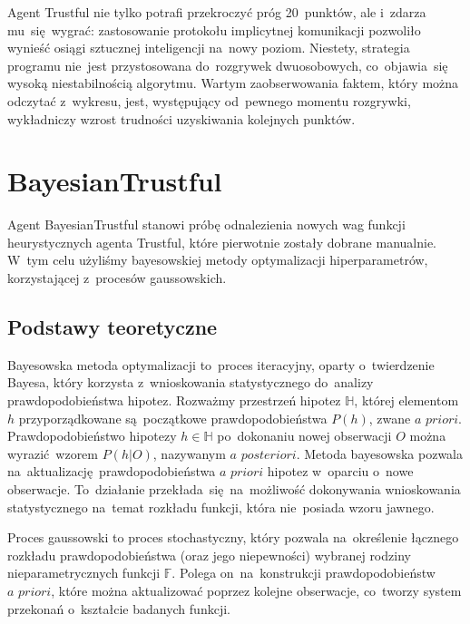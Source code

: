 \documentclass[declaration,shortabstract,inz]{iithesis}
\begin{document}
Agent Trustful nie tylko potrafi przekroczyć próg 20~punktów, ale i~zdarza mu~się~wygrać: zastosowanie protokołu implicytnej komunikacji pozwoliło wynieść osiągi sztucznej inteligencji na~nowy poziom. Niestety, strategia programu nie~jest przystosowana do~rozgrywek dwuosobowych, co~objawia~się wysoką niestabilnością algorytmu. Wartym zaobserwowania faktem, który można odczytać z~wykresu, jest, występujący od~pewnego momentu rozgrywki, wykładniczy wzrost trudności uzyskiwania kolejnych punktów.

\section{BayesianTrustful}

Agent BayesianTrustful stanowi próbę odnalezienia nowych wag funkcji heurystycznych agenta Trustful, które pierwotnie zostały dobrane manualnie. W~tym celu użyliśmy bayesowskiej metody optymalizacji hiperparametrów, korzystającej z~procesów gaussowskich.

\subsection*{Podstawy teoretyczne}

Bayesowska metoda optymalizacji to~proces iteracyjny, oparty o~twierdzenie Bayesa, który korzysta z~wnioskowania statystycznego do~analizy prawdopodobieństwa hipotez. Rozważmy przestrzeń hipotez $\mathbb{H}$, której elementom $h$ przyporządkowane są~początkowe prawdopodobieństwa $P(h)$, zwane $\textit{a priori}$. Prawdopodobieństwo hipotezy $h\in\mathbb{H}$ po~dokonaniu nowej obserwacji $O$ można wyrazić wzorem $P(h|O)$, nazywanym $\textit{a posteriori}$. Metoda bayesowska pozwala na~aktualizację prawdopodobieństwa $\textit{a priori}$ hipotez w~oparciu o~nowe obserwacje. To~działanie przekłada~się~na~możliwość dokonywania wnioskowania statystycznego na~temat rozkładu funkcji, która nie~posiada wzoru jawnego.

Proces gaussowski to proces stochastyczny, który pozwala na~określenie łącznego rozkładu prawdopodobieństwa (oraz jego niepewności) wybranej rodziny nieparametrycznych funkcji $\mathbb{F}$. Polega on~na~konstrukcji prawdopodobieństw $\textit{a priori}$, które można aktualizować poprzez kolejne obserwacje, co~tworzy system przekonań o~kształcie badanych funkcji.
\end{document}
